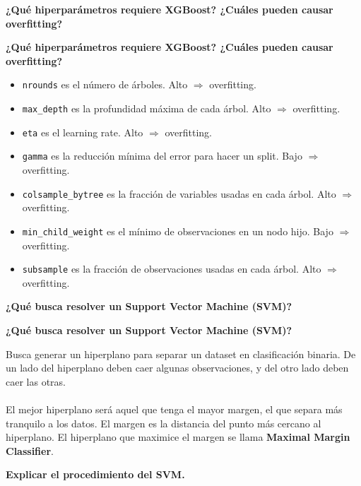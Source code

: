 \documentclass[10pt]{memoir}
\begin{document}
\clearpage
\begin{center}
	\textbf{\Large ¿Qué hiperparámetros requiere XGBoost? ¿Cuáles pueden causar overfitting?} \\
\end{center}

\clearpage
\begin{center}
	\textbf{\Large ¿Qué hiperparámetros requiere XGBoost? ¿Cuáles pueden causar overfitting?} \\
\end{center}
\begin{itemize}
	\item \texttt{nrounds} es el número de árboles. Alto $\Rightarrow$ overfitting.
	\item \texttt{max\_depth} es la profundidad máxima de cada árbol. Alto $\Rightarrow$ overfitting.
	\item \texttt{eta} es el learning rate. Alto $\Rightarrow$ overfitting.
	\item \texttt{gamma} es la reducción mínima del error para hacer un split. Bajo $\Rightarrow$ overfitting.
	\item \texttt{colsample\_bytree} es la fracción de variables usadas en cada árbol. Alto $\Rightarrow$ overfitting.
	\item \texttt{min\_child\_weight} es el mínimo de observaciones en un nodo hijo. Bajo $\Rightarrow$ overfitting.
	\item \texttt{subsample} es la fracción de observaciones usadas en cada árbol. Alto $\Rightarrow$ overfitting.
\end{itemize}


\clearpage
\begin{center}
	\textbf{\Large ¿Qué busca resolver un Support Vector Machine (SVM)?} \\
\end{center}

\clearpage
\begin{center}
	\textbf{\Large ¿Qué busca resolver un Support Vector Machine (SVM)?} \\
\end{center}
\noindent Busca generar un hiperplano para separar un dataset en clasificación binaria. De un lado del hiperplano deben caer algunas observaciones, y del otro lado deben caer las otras. \\
\\
\noindent El mejor hiperplano será aquel que tenga el mayor margen, el que separa más tranquilo a los datos. El margen es la distancia del punto más cercano al hiperplano. El hiperplano que maximice el margen se llama \textbf{Maximal Margin Classifier}.\\
\clearpage
\begin{center}
	\textbf{\Large Explicar el procedimiento del SVM.} \\
\end{center}
\end{document}
